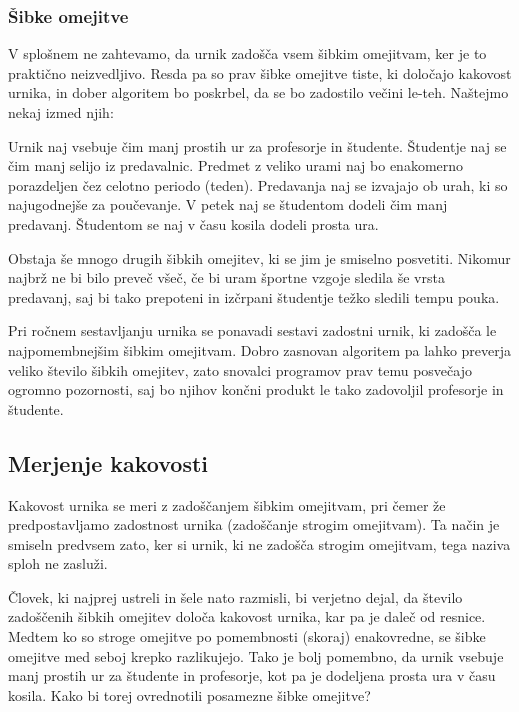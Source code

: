 \documentclass[a4paper,10pt]{article}
\begin{document}
\subsubsection{   Šibke omejitve}
   
   V splošnem ne zahtevamo, da urnik zadošča vsem šibkim omejitvam, ker je to praktično neizvedljivo.
   Resda pa so prav šibke omejitve tiste, ki določajo kakovost urnika, in dober algoritem bo
   poskrbel, da se bo zadostilo večini le-teh. Naštejmo nekaj izmed njih:
   
      Urnik naj vsebuje čim manj prostih ur za profesorje in študente.
      Študentje naj se čim manj selijo iz predavalnic.
      Predmet z veliko urami naj bo enakomerno porazdeljen čez celotno periodo (teden).
      Predavanja naj se izvajajo ob urah, ki so najugodnejše za poučevanje.
      V petek naj se študentom dodeli čim manj predavanj.
      Študentom se naj v času kosila dodeli prosta ura.
   
   Obstaja še mnogo drugih šibkih omejitev, ki se jim je smiselno posvetiti. Nikomur najbrž ne
   bi bilo preveč všeč, če bi uram športne vzgoje sledila še vrsta predavanj, saj bi tako
   prepoteni in izčrpani študentje težko sledili tempu pouka.
   
   Pri ročnem sestavljanju urnika se ponavadi sestavi zadostni urnik, ki zadošča le
   najpomembnejšim šibkim omejitvam. Dobro zasnovan algoritem pa lahko preverja veliko
   število šibkih omejitev, zato snovalci programov prav temu posvečajo ogromno pozornosti,
   saj bo njihov končni produkt le tako zadovoljil profesorje in študente.
   
\subsection{   Merjenje kakovosti}
   
   Kakovost urnika se meri z zadoščanjem šibkim omejitvam, pri čemer že predpostavljamo
   zadostnost urnika (zadoščanje strogim omejitvam). Ta način je smiseln predvsem zato,
   ker si urnik, ki ne zadošča strogim omejitvam, tega naziva sploh ne zasluži.
   
   Človek, ki najprej ustreli in šele nato razmisli, bi verjetno dejal, da število
   zadoščenih šibkih omejitev določa kakovost urnika, kar pa je daleč od resnice. Medtem
   ko so stroge omejitve po pomembnosti (skoraj) enakovredne, se šibke omejitve med seboj
   krepko razlikujejo. Tako je bolj pomembno, da urnik vsebuje manj prostih ur za
   študente in profesorje, kot pa je dodeljena prosta ura v času kosila. Kako bi torej
   ovrednotili posamezne šibke omejitve?
   
\end{document}
